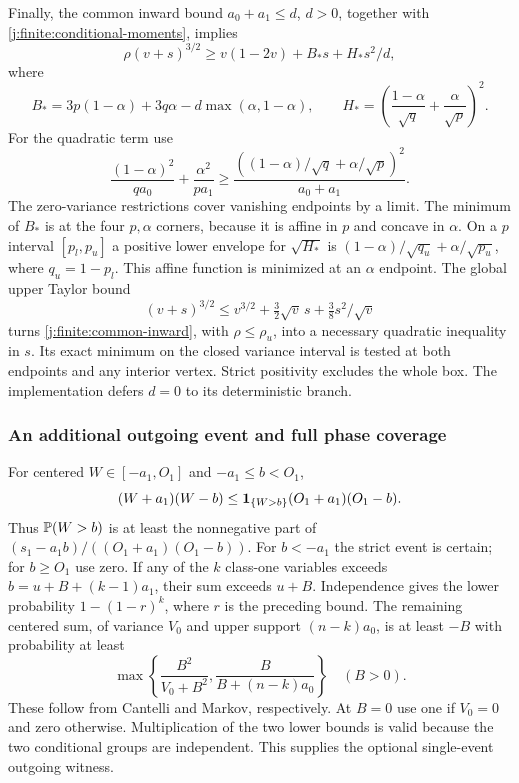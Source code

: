 Finally, the common inward bound $a_0+a_1\le d$, $d>0$,
together with \eqref{j:finite:conditional-moments}, implies
\begin{equation}\label{j:finite:common-inward}
 \rho(v+s)^{3/2}\ge v(1-2v)+B_*s+H_*s^2/d,
\end{equation}
where
\[
 B_*=3p(1-\alpha)+3q\alpha-d\max(\alpha,1-\alpha),\qquad
 H_*=\left(\frac{1-\alpha}{\sqrt q}+\frac\alpha{\sqrt p}\right)^2.
\]
For the quadratic term use
\[
 \frac{(1-\alpha)^2}{qa_0}+\frac{\alpha^2}{pa_1}
 \ge\frac{((1-\alpha)/\sqrt q+\alpha/\sqrt p)^2}{a_0+a_1}.
\]
The zero-variance restrictions cover vanishing endpoints by a limit.
The minimum of $B_*$ is at the four $p,\alpha$ corners, because it is
affine in $p$ and concave in $\alpha$.
On a $p$ interval $[p_l,p_u]$ a positive lower envelope for
$\sqrt{H_*}$ is $(1-\alpha)/\sqrt{q_u}+\alpha/\sqrt{p_u}$,
where $q_u=1-p_l$. This affine function is minimized at an
$\alpha$ endpoint. The global upper Taylor bound
\[
 (v+s)^{3/2}\le v^{3/2}+\tfrac32\sqrt v\,s
                                      +\tfrac38s^2/\sqrt v
\]
turns \eqref{j:finite:common-inward}, with $\rho\le\rho_u$, into a
necessary quadratic inequality in $s$. Its exact minimum on the
closed variance interval is tested at both endpoints and any interior
vertex. Strict positivity excludes the whole box. The implementation
defers $d=0$ to its deterministic branch.

\subsubsection{An additional outgoing event and full phase coverage}
For centered $W\in[-a_1,O_1]$ and $-a_1\le b<O_1$,
\[
 (W+a_1)(W-b)\le\mathbf1_{\{W>b\}}(O_1+a_1)(O_1-b).
\]
Thus $\mathbb P(W>b)$ is at least the nonnegative part of
$(s_1-a_1b)/((O_1+a_1)(O_1-b))$.
For $b<-a_1$ the strict event is certain; for $b\ge O_1$ use zero.
If any of the $k$ class-one variables exceeds
$b=u+B+(k-1)a_1$, their sum exceeds $u+B$.
Independence gives the lower probability $1-(1-r)^k$, where $r$
is the preceding bound. The remaining centered sum, of variance $V_0$
and upper support $(n-k)a_0$, is at least $-B$ with probability at
least
\[
 \max\left\{\frac{B^2}{V_0+B^2},
                         \frac{B}{B+(n-k)a_0}\right\}\quad(B>0).
\]
These follow from Cantelli and Markov, respectively. At $B=0$ use
one if $V_0=0$ and zero otherwise. Multiplication of the two lower
bounds is valid because the two conditional groups are independent.
This supplies the optional single-event outgoing witness.

